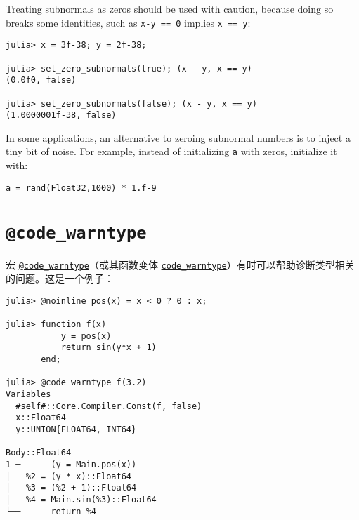 Treating subnormals as zeros should be used with caution, because doing so breaks some identities, such as \texttt{x-y == 0} implies \texttt{x == y}:




\begin{verbatim}
julia> x = 3f-38; y = 2f-38;

julia> set_zero_subnormals(true); (x - y, x == y)
(0.0f0, false)

julia> set_zero_subnormals(false); (x - y, x == y)
(1.0000001f-38, false)
\end{verbatim}



In some applications, an alternative to zeroing subnormal numbers is to inject a tiny bit of noise.  For example, instead of initializing \texttt{a} with zeros, initialize it with:




\begin{verbatim}
a = rand(Float32,1000) * 1.f-9
\end{verbatim}



\hypertarget{7082991166860772411}{}


\section{\texttt{@code\_warntype}}



宏 \hyperlink{8092893264277772840}{\texttt{@code\_warntype}}（或其函数变体 \hyperlink{5565852192659724503}{\texttt{code\_warntype}}）有时可以帮助诊断类型相关的问题。这是一个例子：




\begin{verbatim}
julia> @noinline pos(x) = x < 0 ? 0 : x;

julia> function f(x)
           y = pos(x)
           return sin(y*x + 1)
       end;

julia> @code_warntype f(3.2)
Variables
  #self#::Core.Compiler.Const(f, false)
  x::Float64
  y::UNION{FLOAT64, INT64}

Body::Float64
1 ─      (y = Main.pos(x))
│   %2 = (y * x)::Float64
│   %3 = (%2 + 1)::Float64
│   %4 = Main.sin(%3)::Float64
└──      return %4
\end{verbatim}



